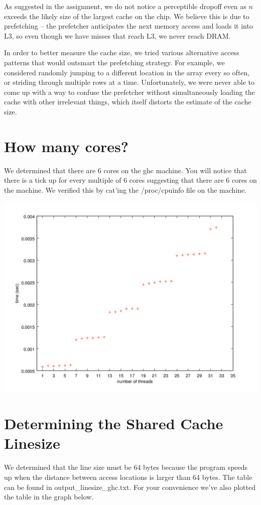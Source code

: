 \documentclass[10pt]{article}
\begin{document}
As suggested in the assignment, we do not notice a perceptible dropoff
even as $n$ exceeds the likely size of the largest cache on the chip. We believe this
is due to prefetching -- the prefetcher anticipates the next memory access and
loads it into L3, so even though we have misses that reach L3, we never reach
DRAM.

In order to better measure the cache size, we tried various alternative access
patterns that would outsmart the prefetching strategy. For example, we
considered randomly jumping to a different location in the array every so often, or
striding through multiple rows at a time. Unfortunately, we were never able to
come up with a way to confuse the prefetcher without simultaneously loading the
cache with other irrelevant things, which itself distorts the estimate of the
cache size.

\section*{How many cores?}
We determined that there are 6 cores on the ghc machine.
You will notice that there is a tick up for every multiple of 6 cores
suggesting that there are 6 cores on the machine.
We verified this by cat'ing the /proc/cpuinfo file on the machine.

\begin{center}
\includegraphics[scale=0.50]{images/core}
\end{center}

\section*{Determining the Shared Cache Linesize}
We determined that the line size must be 64 bytes because the program speeds up
when the distance between access locations is larger than 64 bytes.
The table can be found in output\_linesize\_ghc.txt.  For your convenience
we've also plotted the table in the graph below.
\end{document}

